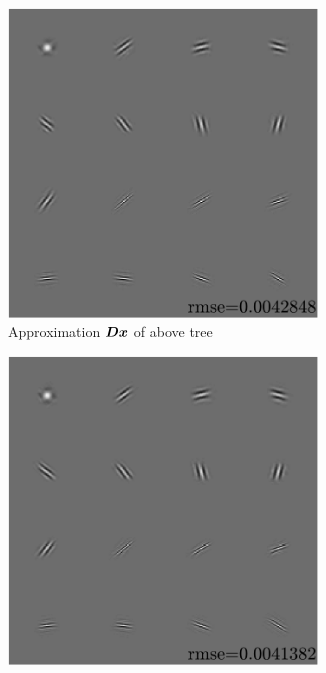 \begin{figure}[!ht] \ContinuedFloat
\begin{subfigure}[b]{0.49\textwidth}\centering
\includegraphics[width=0.9\textwidth]{figures/tree-gradient-vs-sequential/xp_learnsupp256_curvelet_decomp3_tree-binary_dpth4_supp-diracs_usegrad1_every5_add5_totinit0_totadd279_alpha30_approx.pdf}
	\caption{Approximation $\bm{D}\bm{x}$ of above tree}\label{fig_cmpunbalanced-grad_approx}
\end{subfigure}
\begin{subfigure}[b]{0.49\textwidth}\centering
\includegraphics[width=0.9\textwidth]{figures/tree-gradient-vs-sequential/xp_learnsupp256_curvelet_decomp3_tree-binary_dpth4_supp-diracs_usegrad0_every5_add5_totinit0_totadd279_alpha30_approx.pdf} 

\end{subfigure}
\end{figure}
